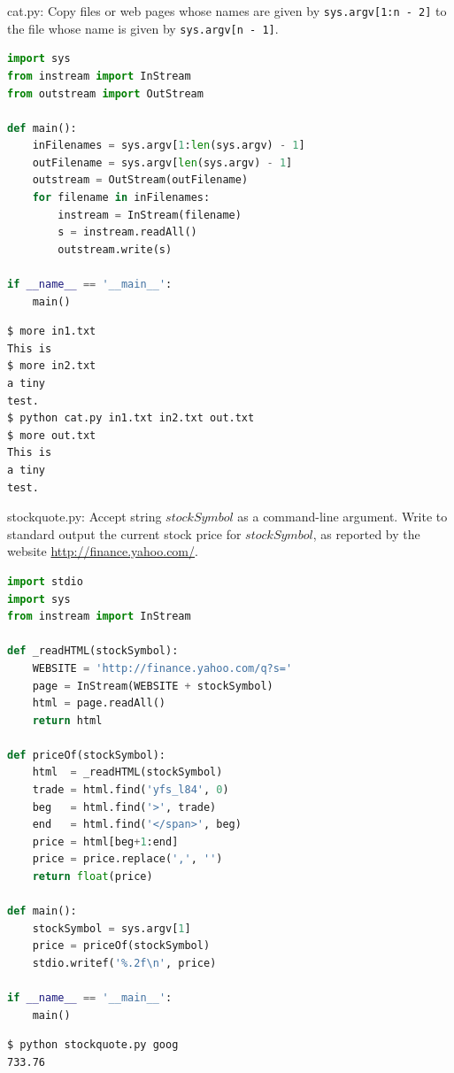 \documentclass[8pt,a4paper,compress,handout]{beamer}
\begin{document}
\begin{frame}[fragile]
\begin{framed}
\tiny cat.py: Copy files or web pages whose names are given by \lstinline{sys.argv[1:n - 2]} to the file whose name is given by \lstinline{sys.argv[n - 1]}.
\end{framed}

\begin{lstlisting}[language=Python]
import sys
from instream import InStream
from outstream import OutStream

def main():
    inFilenames = sys.argv[1:len(sys.argv) - 1]
    outFilename = sys.argv[len(sys.argv) - 1]
    outstream = OutStream(outFilename)
    for filename in inFilenames:
        instream = InStream(filename)
        s = instream.readAll()
        outstream.write(s)

if __name__ == '__main__':
    main()
\end{lstlisting}

\begin{lstlisting}[language={}]
$ more in1.txt
This is
$ more in2.txt
a tiny
test.
$ python cat.py in1.txt in2.txt out.txt
$ more out.txt
This is
a tiny
test.
\end{lstlisting}
\end{frame}

\begin{frame}[fragile]
\begin{framed}
\tiny stockquote.py: Accept string $stockSymbol$ as a command-line argument. Write to standard output the current stock price for $stockSymbol$, as reported by the website \href{http://finance.yahoo.com/}{http://finance.yahoo.com/}.
\end{framed}

\begin{lstlisting}[language=Python]
import stdio
import sys
from instream import InStream

def _readHTML(stockSymbol):
    WEBSITE = 'http://finance.yahoo.com/q?s='
    page = InStream(WEBSITE + stockSymbol)
    html = page.readAll()
    return html

def priceOf(stockSymbol):
    html  = _readHTML(stockSymbol)
    trade = html.find('yfs_l84', 0)
    beg   = html.find('>', trade)
    end   = html.find('</span>', beg)
    price = html[beg+1:end]
    price = price.replace(',', '')
    return float(price)

def main():
    stockSymbol = sys.argv[1]
    price = priceOf(stockSymbol)
    stdio.writef('%.2f\n', price)

if __name__ == '__main__':
    main()
\end{lstlisting}

\begin{lstlisting}[language={}]
$ python stockquote.py goog
733.76
\end{lstlisting}
\end{frame}
\end{document}
